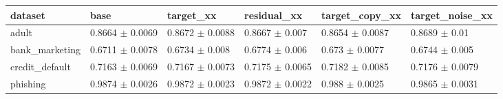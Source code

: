 \begin{tabular}{llllll}
\toprule
dataset & base & target\_xx & residual\_xx & target\_copy\_xx & target\_noise\_xx \\
\midrule
adult & 0.8664 $\pm$ 0.0069 & 0.8672 $\pm$ 0.0088 & 0.8667 $\pm$ 0.007 & 0.8654 $\pm$ 0.0087 & 0.8689 $\pm$ 0.01 \\
bank\_marketing & 0.6711 $\pm$ 0.0078 & 0.6734 $\pm$ 0.008 & 0.6774 $\pm$ 0.006 & 0.673 $\pm$ 0.0077 & 0.6744 $\pm$ 0.005 \\
credit\_default & 0.7163 $\pm$ 0.0069 & 0.7167 $\pm$ 0.0073 & 0.7175 $\pm$ 0.0065 & 0.7182 $\pm$ 0.0085 & 0.7176 $\pm$ 0.0079 \\
phishing & 0.9874 $\pm$ 0.0026 & 0.9872 $\pm$ 0.0023 & 0.9872 $\pm$ 0.0022 & 0.988 $\pm$ 0.0025 & 0.9865 $\pm$ 0.0031 \\
\bottomrule
\end{tabular}
